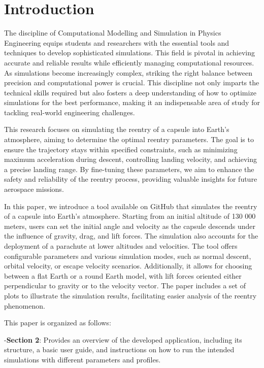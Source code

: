 \documentclass[runningheads]{llncs}
\begin{document}
\section{Introduction}
The discipline of Computational Modelling and Simulation in Physics Engineering equips students and researchers with the essential tools and techniques to develop sophisticated simulations. This field is pivotal in achieving accurate and reliable results while efficiently managing computational resources. As simulations become increasingly complex, striking the right balance between precision and computational power is crucial. This discipline not only imparts the technical skills required but also fosters a deep understanding of how to optimize simulations for the best performance, making it an indispensable area of study for tackling real-world engineering challenges.

This research focuses on simulating the reentry of a capsule into Earth's atmosphere, aiming to determine the optimal reentry parameters. The goal is to ensure the trajectory stays within specified constraints, such as minimizing maximum acceleration during descent, controlling landing velocity, and achieving a precise landing range. By fine-tuning these parameters, we aim to enhance the safety and reliability of the reentry process, providing valuable insights for future aerospace missions.

In this paper, we introduce a tool available on GitHub \cite{git} that simulates the reentry of a capsule into Earth's atmosphere. Starting from an initial altitude of 130 000 meters, users can set the initial angle and velocity as the capsule descends under the influence of gravity, drag, and lift forces. The simulation also accounts for the deployment of a parachute at lower altitudes and velocities. The tool offers configurable parameters and various simulation modes, such as normal descent, orbital velocity, or escape velocity scenarios. Additionally, it allows for choosing between a flat Earth or a round Earth model, with lift forces oriented either perpendicular to gravity or to the velocity vector. The paper includes a set of plots to illustrate the simulation results, facilitating easier analysis of the reentry phenomenon.

This paper is organized as follows:

-\textbf{Section 2}: Provides an overview of the developed application, including its structure, a basic user guide, and instructions on how to run the intended simulations with different parameters and profiles.
\end{document}
